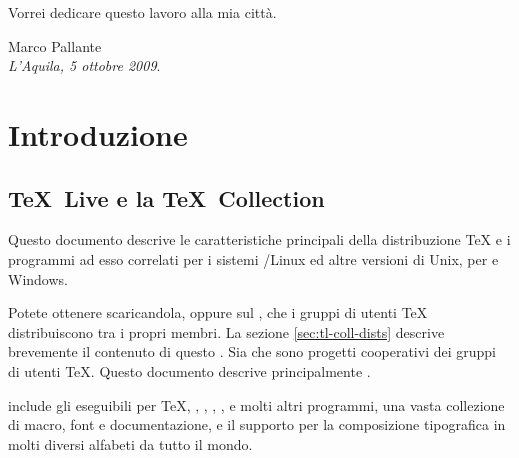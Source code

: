 \documentclass{article}
\begin{document}
Vorrei dedicare questo lavoro alla mia città.

\bigskip

\noindent Marco Pallante\\
\emph{L'Aquila, 5 ottobre 2009}.


\section{Introduzione}
\label{sec:intro}

\subsection{\TeX\ Live e la \TeX\ Collection}

Questo documento descrive le caratteristiche principali della
distribuzione \TL{}\Dash \TeX{} e i programmi ad esso correlati
per i sistemi \GNU/Linux ed altre versioni di Unix, per \MacOSX
e Windows.

Potete ottenere \TL{} scaricandola, oppure sul \DVD{} \TK, che
i gruppi di utenti \TeX{} distribuiscono tra i propri membri.
La sezione \ref{sec:tl-coll-dists} descrive brevemente il
contenuto di questo \DVD. Sia \TL{} che \TK{} sono progetti
cooperativi dei gruppi di utenti \TeX. Questo documento descrive
principalmente \TL.

\TL{} include gli eseguibili per \TeX, \LaTeXe, \ConTeXt, \MF,
\MP, \BibTeX{} e molti altri programmi, una vasta collezione di macro,
font e documentazione, e il supporto per la composizione tipografica
in molti diversi alfabeti da tutto il mondo.
\end{document}
